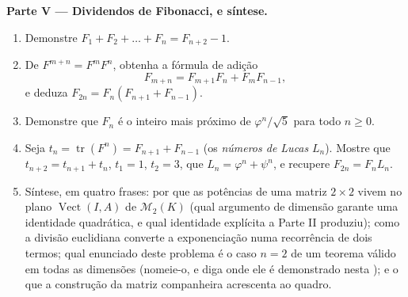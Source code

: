 \begin{problem}
\medskip
\noindent\textbf{Parte V --- Dividendos de Fibonacci, e síntese.}
\begin{enumerate}[resume]
  \item Demonstre $F_1 + F_2 + \dots + F_n = F_{n+2} - 1$.
  \item De $F^{m+n} = F^m F^n$, obtenha a fórmula de adição
        \[
        F_{m+n} = F_{m+1}F_n + F_m F_{n-1},
        \]
        e deduza $F_{2n} = F_n(F_{n+1} + F_{n-1})$.
  \item Demonstre que $F_n$ é o inteiro mais próximo de $\varphi^n/\sqrt5$ para
        todo $n \geq 0$.
  \item Seja $t_n = \operatorname{tr}(F^n) = F_{n+1} + F_{n-1}$ (os \emph{números de Lucas} $L_n$). Mostre que
        $t_{n+2} =
        t_{n+1} + t_n$, $t_1 = 1$, $t_2 = 3$, que $L_n =
        \varphi^n + \psi^n$, e recupere $F_{2n} = F_n L_n$.
  \item Síntese, em quatro frases: por que as potências de uma
        matriz $2
        \times 2$ vivem no plano $\operatorname{Vect}(I, A)$ de $\mathcal{M}_2(K)$ (qual argumento
        de dimensão garante uma identidade quadrática, e qual
        identidade explícita a Parte II produziu); como a divisão
        euclidiana converte a exponenciação numa recorrência de
        dois termos; qual enunciado deste problema é o caso $n =
        2$
        de um teorema válido em todas as dimensões (nomeie-o, e
        diga onde ele é demonstrado nesta ); e o que a
        construção da matriz companheira acrescenta ao quadro.
\end{enumerate}
\end{problem}

